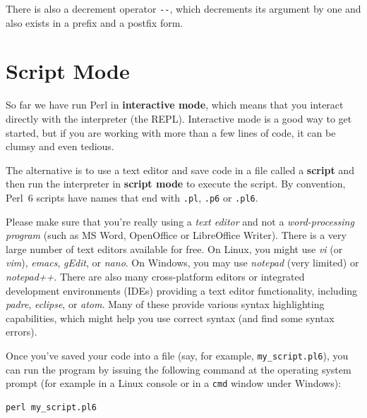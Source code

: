 There is also a decrement operator \verb"--", which decrements its 
argument by one and also exists in a prefix and a postfix form. 



\section{Script Mode}

So far we have run Perl in {\bf interactive mode}, which
means that you interact directly with the interpreter (the 
REPL). Interactive mode is a good way to get started,
but if you are working with more than a few lines of code, 
it can be clumsy and even tedious.

The alternative is to use a text editor and save code in a file 
called a {\bf script} and then run the interpreter in {\bf script mode} 
to execute the script.  By convention, Perl~6 scripts have names that 
end with {\tt .pl}, {\tt .p6} or {\tt .pl6}.

Please make sure that you're really using a \emph{text editor} 
and not a \emph{word-processing program} (such as MS Word, 
OpenOffice or LibreOffice Writer). There is a very large 
number of text editors available for free. On Linux, you might use 
\emph{vi} (or \emph{vim}), \emph{emacs}, \emph{gEdit}, or 
\emph{nano}. On Windows, you may use \emph{notepad} (very limited) 
or \emph{notepad++}. There are also many cross-platform editors  
or integrated development environments (IDEs) providing a 
text editor functionality, including \emph{padre}, \emph{eclipse}, 
or \emph{atom}. Many of these provide various syntax highlighting 
capabilities, which might help you use correct syntax (and 
find some syntax errors).

Once you've saved your code into a file (say, for example, 
\verb'my_script.pl6'), you can run the program by issuing 
the following command at the operating system prompt (for example 
in a Linux console or in a \verb'cmd' window under Windows):
\begin{verbatim}
perl my_script.pl6
\end{verbatim}

